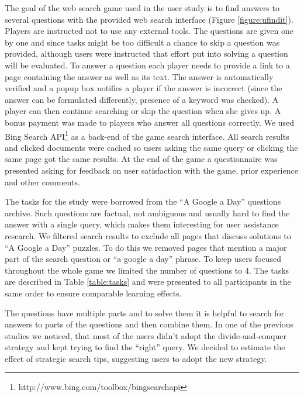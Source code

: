 \documentclass{sig-alternate}
\begin{document}
The goal of the web search game used in the user study is to find answers to several questions with the provided web search interface (Figure \ref{figure:ufindit}). 
Players are instructed not to use any external tools.
The questions are given one by one and since tasks might be too difficult a chance to skip a question was provided, although users were instructed that effort put into solving a question will be evaluated.
To answer a question each player needs to provide a link to a page containing the answer as well as its text.
The answer is automatically verified and a popup box notifies a player if the answer is incorrect (since the answer can be formulated differently, presence of a keyword was checked).
A player can then continue searching or skip the question when she gives up.
A bonus payment was made to players who answer all questions correctly.
We used Bing Search API\footnote{http://www.bing.com/toolbox/bingsearchapi} as a back-end of the game search interface.
All search results and clicked documents were cached so users asking the same query or clicking the same page got the same results.
At the end of the game a questionnaire was presented asking for feedback on user satisfaction with the game, prior experience and other comments.

The tasks for the study were borrowed from the ``A Google a Day'' questions archive.
Such questions are factual, not ambiguous and usually hard to find the answer with a single query, which makes them interesting for user assistance research.
We filtered search results to exclude all pages that discuss solutions to ``A Google a Day'' puzzles.
To do this we removed pages that mention a major part of the search question or ``a google a day'' phrase.
To keep users focused throughout the whole game we limited the number of questions to 4.
The tasks are described in Table \ref{table:tasks} and were presented to all participants in the same order to ensure comparable learning effects.

The questions have multiple parts and to solve them it is helpful to search for answers to parts of the questions and then combine them.
In one of the previous studies we noticed, that most of the users didn't adopt the divide-and-conquer strategy and kept trying to find the ``right'' query.
We decided to estimate the effect of strategic search tips, suggesting users to adopt the new strategy.
\end{document}
